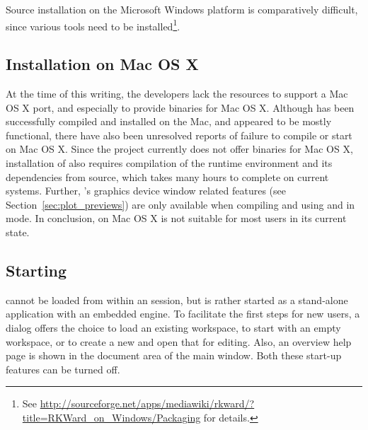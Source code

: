Source installation on the Microsoft Windows platform is comparatively difficult, since various tools need to
be installed\footnote{
  See \url{http://sourceforge.net/apps/mediawiki/rkward/?title=RKWard\_on\_Windows/Packaging} for details.
}.

\subsection{Installation on Mac OS X}
At the time of this writing, the developers lack the resources to support a Mac OS X port, and especially
to provide binaries for Mac OS X. Although  has been successfully compiled and installed on the Mac, and
appeared to be mostly functional, there have also been unresolved reports of failure to compile or start
 on Mac OS X. Since the  project currently does not offer binaries for Mac OS X,
installation of  also requires compilation of the  runtime environment and its
dependencies from source, which takes many hours to complete on current systems. Further, 's
graphics device window related features (see Section~\ref{sec:plot_previews}) are only available when
compiling and using  and  in  mode. In conclusion,  on Mac OS X is
not suitable for most users in its current state.

\subsection[Starting RKWard]{Starting }
 cannot be loaded from within an 
session, but is rather started as a stand-alone application with an
embedded  engine. To facilitate the first
steps for new users, a dialog offers the choice to load an existing
workspace, to start with an empty workspace, or to create a new
 and open that for editing. Also, an overview help page is
shown in the document area of the main window. Both these start-up features
can be turned off.

